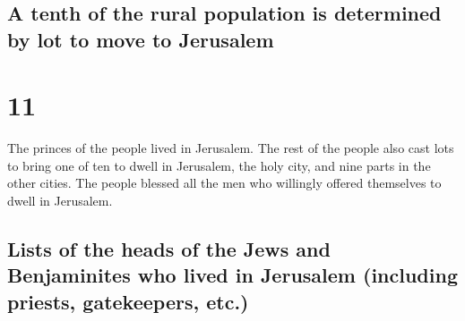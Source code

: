 \begin{paracol}{2}
\switchcolumn
\begin{otherlanguage}{english}

\hypertarget{a-tenth-of-the-rural-population-is-determined-by-lot-to-move-to-jerusalem}{%
\subsection{A tenth of the rural population is determined by lot to move
to
Jerusalem}\label{a-tenth-of-the-rural-population-is-determined-by-lot-to-move-to-jerusalem}}

\hypertarget{section-21}{%
\section{11}\label{section-21}}

 The princes of the people lived in Jerusalem. The rest of
the people also cast lots to bring one of ten to dwell in Jerusalem, the
holy city, and nine parts in the other cities.  The people
blessed all the men who willingly offered themselves to dwell in
Jerusalem.

\hypertarget{lists-of-the-heads-of-the-jews-and-benjaminites-who-lived-in-jerusalem-including-priests-gatekeepers-etc.}{%
\subsection{Lists of the heads of the Jews and Benjaminites who lived in
Jerusalem (including priests, gatekeepers,
etc.)}\label{lists-of-the-heads-of-the-jews-and-benjaminites-who-lived-in-jerusalem-including-priests-gatekeepers-etc.}}


\end{otherlanguage}
\end{paracol}
